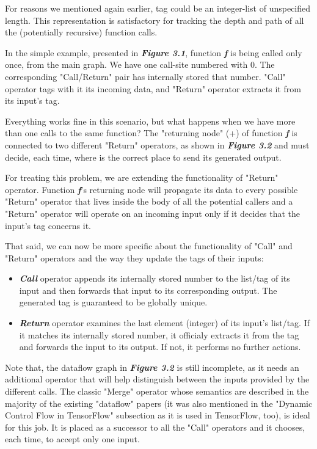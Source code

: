 \documentclass[ack,preface]{dithesis}
\begin{document}
For reasons we mentioned again earlier, tag could be an integer-list of unspecified length. This representation is satisfactory for tracking the depth and path of all the (potentially recursive) function calls.

In the simple example, presented in \textit{\textbf{Figure 3.1}}, function \textit{\textbf{f}} is being called only once, from the main graph. We have one call-site numbered with 0. The corresponding "Call/Return" pair has internally stored that number. "Call" operator tags with it its incoming data, and "Return" operator extracts it from its input's tag. 

Everything works fine in this scenario, but what happens when we have more than one calls to the same function? 
The "returning node" (+) of function  \textit{\textbf{f}} is connected to  two different "Return" operators, as shown in \textit{\textbf{Figure 3.2}} and must decide, each time,  where is the correct place to send its generated output.

For treating this problem, we are extending the functionality of "Return" operator.  Function \textit{\textbf{f}}'s returning node will  propagate its data to every possible "Return" operator that lives inside the body of all the potential callers and a "Return" operator will operate on an incoming input only if it decides that the input's tag concerns it.

That said, we can now be more specific about the functionality of  "Call" and "Return" operators and the way they update the tags of their inputs:
    \begin{itemize}
    \item \textit{\textbf{Call }} operator appends its internally stored number to the list/tag of its input and then forwards that input to its corresponding output. The generated tag is guaranteed to be globally unique.
    \item \textit{\textbf{Return }} operator examines the last element (integer) of its input's list/tag. If it matches its internally stored number, it officialy extracts it from the tag and forwards the input to its output. If not,  it performs no further actions.
    \end{itemize}

Note that, the dataflow graph in \textit{\textbf{Figure 3.2}} is still incomplete, as it needs an additional operator that will help distinguish between the inputs provided by the different calls. The classic "Merge" operator whose semantics are described in the majority of  the existing "dataflow" papers (it was also mentioned in the "Dynamic Control Flow in TensorFlow" subsection as it is used in TensorFlow, too), is ideal for this job. It is placed as a successor to all the "Call" operators and it chooses, each time, to accept only one input.
\end{document}

